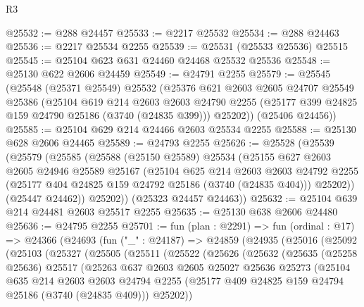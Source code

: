 \begin{lexlean}{R3}
\begin{coremodule}
@25532 := @288 @24457
@25533 := @2217 @25532
@25534 := @288 @24463
@25536 := @2217 @25534 @2255
@25539 := @25531 (@25533 @25536) @25515
@25545 := @25104 @623 @631 @24460 @24468 @25532 @25536
@25548 := @25130 @622 @2606 @24459
@25549 := @24791 @2255
@25579 := @25545
    (@25548
      (@25371 @25549)
      @25532
      (@25376
        @621
        @2603
        @2605
        @24707
        @25549
        @25386
        (@25104
          @619
          @214
          @2603
          @2603
          @24790
          @2255
          (@25177 @399 @24825 @159 @24790 @25186 (@3740 (@24835 @399)))
          @25202))
      (@25406 @24456))
@25585 := @25104 @629 @214 @24466 @2603 @25534 @2255
@25588 := @25130 @628 @2606 @24465
@25589 := @24793 @2255
@25626 := @25528
    (@25539
      (@25579
        (@25585
          (@25588
            (@25150 @25589)
            @25534
            (@25155
              @627
              @2603
              @2605
              @24946
              @25589
              @25167
              (@25104
                @625
                @214
                @2603
                @2603
                @24792
                @2255
                (@25177 @404 @24825 @159 @24792 @25186 (@3740 (@24835 @404)))
                @25202))
            (@25447 @24462))
          @25202))
      (@25323 @24457 @24463))
@25632 := @25104 @639 @214 @24481 @2603 @25517 @2255
@25635 := @25130 @638 @2606 @24480
@25636 := @24795 @2255
@25701 := fun (plan : @2291) =>
  fun (ordinal : @17) =>
  @24366
    (@24693
      (fun ("_" : @24187) =>
      @24859
        (@24935
          (@25016
            (@25092
              (@25103
                (@25327
                  (@25505
                    (@25511
                      (@25522
                        (@25626
                          (@25632
                            (@25635
                              (@25258 @25636)
                              @25517
                              (@25263
                                @637
                                @2603
                                @2605
                                @25027
                                @25636
                                @25273
                                (@25104
                                  @635
                                  @214
                                  @2603
                                  @2603
                                  @24794
                                  @2255
                                  (@25177 @409 @24825 @159 @24794 @25186 (@3740 (@24835 @409)))
                                  @25202))

\end{coremodule}
\end{lexlean}

